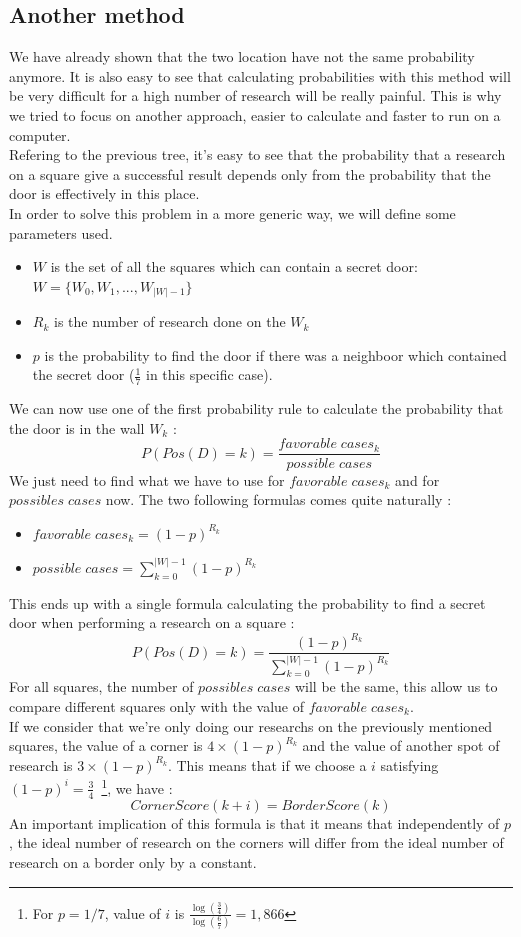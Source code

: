 \documentclass{article}
\begin{document}
\subsection{Another method}
We have already shown that the two location have not the same probability
anymore. It is also easy to see that calculating probabilities with this
method will be very difficult for a high number of research will be really
painful. This is why we tried to focus on another approach, easier to
calculate and faster to run on a computer.\\
Refering to the previous tree, it's easy to see that the probability that a
research on a square give a successful result depends only from the
probability that the door is effectively in this place.
\\
In order to solve this problem in a more generic way, we will define some
parameters used.
\begin{itemize}
\item $W$ is the set of all the squares which can contain a secret door:
  $W = \{W_0,W_1, ... , W_{|W| -1} \}$
\item $R_k$ is the number of research done on the $W_k$
\item $p$ is the probability to find the door if there was a neighboor which
  contained the secret door ($\frac{1}{7}$ in this specific case).
\end{itemize}

We can now use one of the first probability rule to calculate the probability
that the door is in the wall $W_k$ :
$$P(Pos(D) = k) = \frac{favorable\;cases_k}{possible\;cases}$$
We just need to find what we have to use for $favorable\;cases_k$ and for
$possibles\;cases$ now. The two following formulas comes quite naturally :
\begin{itemize}
\item $favorable\;cases_k = (1-p)^{R_k}$
\item $possible\;cases = \sum\limits_{k=0}^{|W| - 1}{(1-p) ^{R_k}}$
\end{itemize}

This ends up with a single formula calculating the probability to find a secret
door when performing a research on a square :
$$ P(Pos(D) = k) = \frac{(1-p)^{R_k}}{\sum\limits_{k=0}^{|W| - 1}{(1-p) ^{R_k}}}$$
For all squares, the number of $possibles\;cases$ will be the same, this allow
us to compare different squares only with the value of $favorable\;cases_k$.
\\
If we consider that we're only doing our researchs on the previously mentioned
squares, the value of a corner is $4 \times (1-p)^{R_k}$ and the value of
another spot of research is $3 \times (1-p)^{R_k}$. This means that if we choose
a $i$ satisfying $(1-p)^i = \frac{3}{4}$~\footnote{For $p = 1/7$,
value of $i$ is $\frac{\log(\frac{3}{4})}{\log(\frac{6}{7})} = 1,866$}, we
have :
$$ CornerScore(k + i) = BorderScore (k) $$
An important implication of this formula is that it means that independently of
$p$, the ideal number of research on the corners will differ from the ideal
number of research on a border only by a constant.
\end{document}
